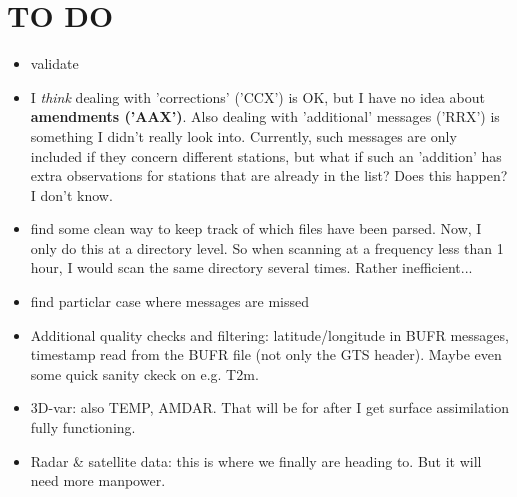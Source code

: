 \documentclass[10pt]{article}
\begin{document}
\section{TO DO}
\begin{itemize}
\item validate
\item I \emph{think} dealing with 'corrections' ('CCX') is OK, but I have no idea about \textbf{amendments ('AAX')}. Also dealing with 'additional' messages ('RRX') is something I didn't really look into. Currently, such messages are only included if they concern different stations, but what if such an 'addition' has extra observations for stations that are already in the list? Does this happen? I don't know.
\item find some clean way to keep track of which files have been parsed. Now, I only do this at a directory level. So when scanning at a frequency less than 1 hour, I would scan the same directory several times. Rather inefficient...
\item find particlar case where messages are missed
\item Additional quality checks and filtering: latitude/longitude in BUFR messages, timestamp read from the BUFR file (not only the GTS header). Maybe even some quick sanity ckeck on e.g. T2m.
\item 3D-var: also TEMP, AMDAR. That will be for after I get surface assimilation fully functioning.
\item Radar \& satellite data: this is where we finally are heading to. But it will need more manpower.
\end{itemize}
\end{document}
